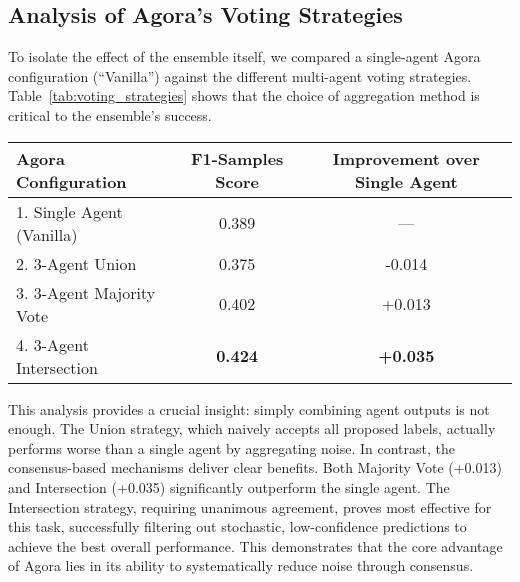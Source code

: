 \subsection{Analysis of Agora's Voting Strategies}

To isolate the effect of the ensemble itself, we compared a single-agent Agora configuration (``Vanilla'') against the different multi-agent voting strategies. Table~\ref{tab:voting_strategies} shows that the choice of aggregation method is critical to the ensemble's success.

\begin{table*}[!ht]
\centering
\caption{Ablation of Agora Configurations on the English Dataset (F1-Samples).}
\label{tab:voting_strategies}
\begin{tabular}{lcc}
\hline
\textbf{Agora Configuration} & \textbf{F1-Samples Score} & \textbf{Improvement over Single Agent} \\
\hline
1. Single Agent (Vanilla) & 0.389 & --- \\
2. 3-Agent Union & 0.375 & -0.014 \\
3. 3-Agent Majority Vote & 0.402 & +0.013 \\
4. 3-Agent Intersection & \textbf{0.424} & \textbf{+0.035} \\
\hline
\end{tabular}
\end{table*}

This analysis provides a crucial insight: simply combining agent outputs is not enough. The Union strategy, which naively accepts all proposed labels, actually performs worse than a single agent by aggregating noise. In contrast, the consensus-based mechanisms deliver clear benefits. Both Majority Vote (+0.013) and Intersection (+0.035) significantly outperform the single agent. The Intersection strategy, requiring unanimous agreement, proves most effective for this task, successfully filtering out stochastic, low-confidence predictions to achieve the best overall performance. This demonstrates that the core advantage of Agora lies in its ability to systematically reduce noise through consensus.

